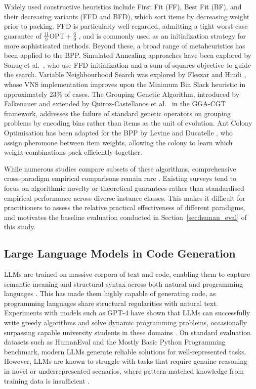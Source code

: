 \documentclass[11pt]{article}
\begin{document}
Widely used constructive heuristics include First Fit (FF), Best Fit 
(BF), and their decreasing variants (FFD and BFD), which sort items by 
decreasing weight prior to packing. FFD is particularly well-regarded, 
admitting a tight worst-case guarantee of $\frac{11}{9}\text{OPT} + 
\frac{6}{9}$ \cite{dosa}, and is commonly used as an initialization strategy 
for more sophisticated methods. Beyond these, a broad range of metaheuristics 
has been applied to the BPP. Simulated Annealing approaches have been 
explored by Sonuç et al.\ \cite{sonuc}, who use FFD initialization and a 
sum-of-squares objective to guide the search. Variable Neighbourhood Search 
was explored by Fleszar and Hindi \cite{kryz}, whose VNS implementation 
improves upon the Minimum Bin Slack heuristic in approximately 23\% of cases. 
The Grouping Genetic Algorithm, introduced by Falkenauer \cite{gga} and 
extended by Quiroz-Castellanos et al.\ \cite{quirozca} in the GGA-CGT 
framework, addresses the failure of standard genetic operators on 
grouping problems by encoding bins rather than items as the unit of evolution. 
Ant Colony Optimisation has been adapted for the BPP by Levine and Ducatelle 
\cite{levine}, who assign pheromone between item weights, allowing the colony to learn which weight combinations pack 
efficiently together.

While numerous studies compare subsets of these algorithms, comprehensive 
cross-paradigm empirical comparisons remain rare \cite{munien}. Existing 
surveys tend to focus on algorithmic novelty or theoretical guarantees rather 
than standardised empirical performance across diverse instance classes. This 
makes it difficult for practitioners to assess the relative practical 
effectiveness of different paradigms, and motivates the baseline evaluation 
conducted in Section~\ref{sec:human_eval} of this study.

\subsection{Large Language Models in Code Generation}

LLMs are trained on massive corpora of text and code, enabling them to 
capture semantic meaning and structural syntax across both natural and 
programming languages \cite{chang}. This has made them highly capable of 
generating code, as programming languages share structural regularities with 
natural text. Experiments with models such as GPT-4 have shown that LLMs can 
successfully write greedy algorithms and solve dynamic programming problems, 
occasionally surpassing capable university students in these domains 
\cite{bubeck, chang}. On standard evaluation datasets such as HumanEval and 
the Mostly Basic Python Programming benchmark, modern LLMs generate reliable 
solutions for well-represented tasks. However, LLMs are known to struggle 
with tasks that require genuine reasoning in novel or underrepresented 
scenarios, where pattern-matched knowledge from training data is insufficient 
\cite{kucharavy}.
\end{document}
